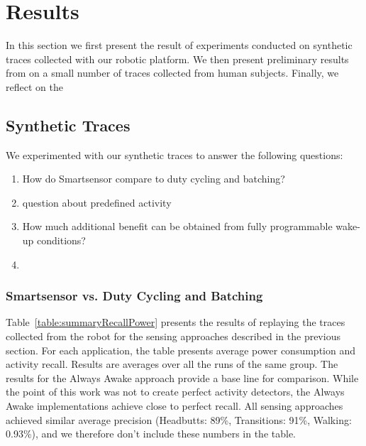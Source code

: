 \section{Results}
\label{sec:results}

In this section we first present the result of experiments conducted
on synthetic traces collected with our robotic platform.  We then
present preliminary results from on a small number of traces collected
from human subjects.  Finally, we reflect on the 

\subsection{Synthetic Traces}

We experimented with our synthetic traces to answer the following questions:

\begin{enumerate}
\setlength{\itemsep}{-3pt}  

\item How do Smartsensor compare to duty cycling and batching?

\item question about predefined activity

\item How much additional benefit can be obtained from fully
  programmable wake-up conditions?

\item 


\end{enumerate}

\subsubsection{Smartsensor vs. Duty Cycling and Batching}

Table~\ref{table:summaryRecallPower} presents the results of replaying
the traces collected from the robot for the sensing approaches
described in the previous section.  For each application, the table
presents average power consumption and activity recall.  Results are
averages over all the runs of the same group.  The results for the
Always Awake approach provide a base line for comparison.  While the
point of this work was not to create perfect activity detectors, the
Always Awake implementations achieve close to perfect recall.  All
sensing approaches achieved similar average precision (Headbutts:
89\%, Transitions: 91\%, Walking: 0.93\%), and we therefore don't
include these numbers in the table.

